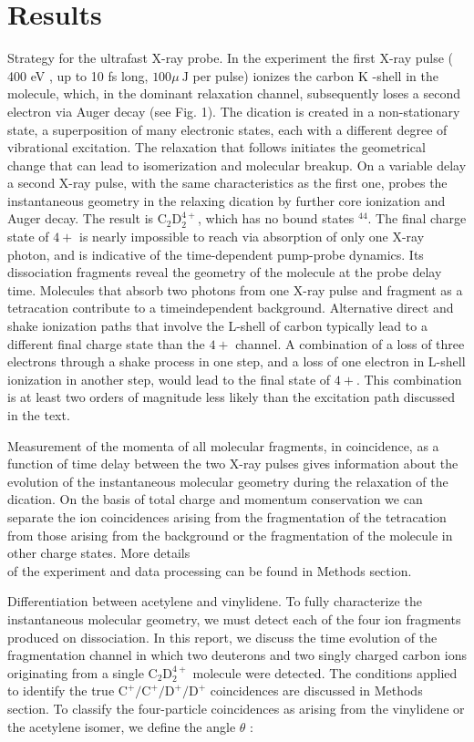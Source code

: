 \documentclass[10pt]{article}
\begin{document}
\section*{Results}
Strategy for the ultrafast X-ray probe. In the experiment the first X-ray pulse ( 400 eV , up to 10 fs long, $100 \mu \mathrm{~J}$ per pulse) ionizes the carbon K -shell in the molecule, which, in the dominant relaxation channel, subsequently loses a second electron via Auger decay (see Fig. 1). The dication is created in a non-stationary state, a superposition of many electronic states, each with a different degree of vibrational excitation. The relaxation that follows initiates the geometrical change that can lead to isomerization and molecular breakup. On a variable delay a second X-ray pulse, with the same characteristics as the first one, probes the instantaneous geometry in the relaxing dication by further core ionization and Auger decay. The result is $\mathrm{C}_{2} \mathrm{D}_{2}^{4+}$, which has no bound states ${ }^{44}$. The final charge state of $4+$ is nearly impossible to reach via absorption of only one X-ray photon, and is indicative of the time-dependent pump-probe dynamics. Its dissociation fragments reveal the geometry of the molecule at the probe delay time. Molecules that absorb two photons from one X-ray pulse and fragment as a tetracation contribute to a timeindependent background. Alternative direct and shake ionization paths that involve the L-shell of carbon typically lead to a different final charge state than the $4+$ channel. A combination of a loss of three electrons through a shake process in one step, and a loss of one electron in L-shell ionization in another step, would lead to the final state of $4+$. This combination is at least two orders of magnitude less likely than the excitation path discussed in the text.

Measurement of the momenta of all molecular fragments, in coincidence, as a function of time delay between the two X-ray pulses gives information about the evolution of the instantaneous molecular geometry during the relaxation of the dication. On the basis of total charge and momentum conservation we can separate the ion coincidences arising from the fragmentation of the tetracation from those arising from the background or the fragmentation of the molecule in other charge states. More details\\
of the experiment and data processing can be found in Methods section.

Differentiation between acetylene and vinylidene. To fully characterize the instantaneous molecular geometry, we must detect each of the four ion fragments produced on dissociation. In this report, we discuss the time evolution of the fragmentation channel in which two deuterons and two singly charged carbon ions originating from a single $\mathrm{C}_{2} \mathrm{D}_{2}^{4+}$ molecule were detected. The conditions applied to identify the true $\mathrm{C}^{+} / \mathrm{C}^{+} / \mathrm{D}^{+} / \mathrm{D}^{+}$ coincidences are discussed in Methods section. To classify the four-particle coincidences as arising from the vinylidene or the acetylene isomer, we define the angle $\theta$ :
\end{document}
